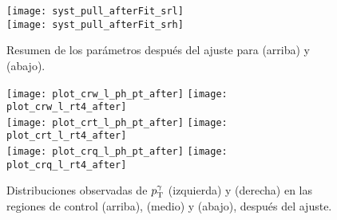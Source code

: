 \begin{figure}[!h]
  \centering

  \texttt{[image: syst\_pull\_afterFit\_srl]} \\
  \texttt{[image: syst\_pull\_afterFit\_srh]}

  \caption{Resumen de los parámetros después del ajuste para {\SRL} (arriba) y {\SRH} (abajo).}
  \label{fig:fit_unc_nuisance}

\end{figure}







\begin{figure}[!h]
  \centering

  \texttt{[image: plot\_crw\_l\_ph\_pt\_after]} \hspace{1cm}
  \texttt{[image: plot\_crw\_l\_rt4\_after]} \\

  \texttt{[image: plot\_crt\_l\_ph\_pt\_after]} \hspace{1cm}
  \texttt{[image: plot\_crt\_l\_rt4\_after]} \\

  \texttt{[image: plot\_crq\_l\_ph\_pt\_after]} \hspace{1cm}
  \texttt{[image: plot\_crq\_l\_rt4\_after]} \\

   \caption{Distribuciones observadas de $p_{\mathrm{T}}^\gamma$ (izquierda) y {\rt} (derecha) en las
     regiones de control {\CRWL} (arriba), {\CRTL} (medio) y {\CRQL} (abajo),
     después del ajuste.}
   \label{fig:bkgfit_crl_after}

\end{figure}



